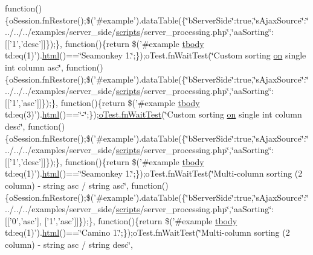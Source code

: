 \begin{DoxyCompactItemize}
function()\{o\+Session.\+fn\+Restore();\$('\#example').data\+Table(\{\char`\"{}b\+Server\+Side\char`\"{}\+:true,\char`\"{}s\+Ajax\+Source\char`\"{}\+:\char`\"{}../../../examples/server\+\_\+side/\hyperlink{tinymce_8jquery_8dev_8js_a09066d4d580eeec222f858d588b4cdef}{scripts}/server\+\_\+processing.\+php\char`\"{},\char`\"{}aa\+Sorting\char`\"{}\+:\mbox{[}\mbox{[}'1','desc'\mbox{]}\mbox{]}\});\}, function()\{return \$('\#example \hyperlink{core_8constructor_8js_a99b0542c7c50fe8757c55bf9dac5f3be}{tbody} td\+:eq(1)').\hyperlink{tinymce_8jquery_8dev_8js_ac2090bcf2ff968c0083d5de53a6544f3}{html}()==\char`\"{}Seamonkey 1.\char`\"{};\});o\+Test.\+fn\+Wait\+Test(\char`\"{}Custom sorting \hyperlink{fullpage_2plugin_8min_8js_a1cfa98b7fed2aaf9fee3b68dbb7f9497}{on} single int column asc\char`\"{}, function()\{o\+Session.\+fn\+Restore();\$('\#example').data\+Table(\{\char`\"{}b\+Server\+Side\char`\"{}\+:true,\char`\"{}s\+Ajax\+Source\char`\"{}\+:\char`\"{}../../../examples/server\+\_\+side/\hyperlink{tinymce_8jquery_8dev_8js_a09066d4d580eeec222f858d588b4cdef}{scripts}/server\+\_\+processing.\+php\char`\"{},\char`\"{}aa\+Sorting\char`\"{}\+:\mbox{[}\mbox{[}'1','asc'\mbox{]}\mbox{]}\});\}, function()\{return \$('\#example \hyperlink{core_8constructor_8js_a99b0542c7c50fe8757c55bf9dac5f3be}{tbody} td\+:eq(3)').\hyperlink{tinymce_8jquery_8dev_8js_ac2090bcf2ff968c0083d5de53a6544f3}{html}()==\char`\"{}-\/\char`\"{};\});\hyperlink{onhold_24__server-side_2__zero__config_8js_ab25c4d596771c0133cdc45178ce72c3d}{o\+Test.\+fn\+Wait\+Test}(\char`\"{}Custom sorting \hyperlink{fullpage_2plugin_8min_8js_a1cfa98b7fed2aaf9fee3b68dbb7f9497}{on} single int column desc\char`\"{}, function()\{o\+Session.\+fn\+Restore();\$('\#example').data\+Table(\{\char`\"{}b\+Server\+Side\char`\"{}\+:true,\char`\"{}s\+Ajax\+Source\char`\"{}\+:\char`\"{}../../../examples/server\+\_\+side/\hyperlink{tinymce_8jquery_8dev_8js_a09066d4d580eeec222f858d588b4cdef}{scripts}/server\+\_\+processing.\+php\char`\"{},\char`\"{}aa\+Sorting\char`\"{}\+:\mbox{[}\mbox{[}'1','desc'\mbox{]}\mbox{]}\});\}, function()\{return \$('\#example \hyperlink{core_8constructor_8js_a99b0542c7c50fe8757c55bf9dac5f3be}{tbody} td\+:eq(1)').\hyperlink{tinymce_8jquery_8dev_8js_ac2090bcf2ff968c0083d5de53a6544f3}{html}()==\char`\"{}Seamonkey 1.\char`\"{};\});o\+Test.\+fn\+Wait\+Test(\char`\"{}Multi-\/column sorting (2 column) -\/ string asc / string asc\char`\"{}, function()\{o\+Session.\+fn\+Restore();\$('\#example').data\+Table(\{\char`\"{}b\+Server\+Side\char`\"{}\+:true,\char`\"{}s\+Ajax\+Source\char`\"{}\+:\char`\"{}../../../examples/server\+\_\+side/\hyperlink{tinymce_8jquery_8dev_8js_a09066d4d580eeec222f858d588b4cdef}{scripts}/server\+\_\+processing.\+php\char`\"{},\char`\"{}aa\+Sorting\char`\"{}\+:\mbox{[}\mbox{[}'0','asc'\mbox{]}, \mbox{[}'1','asc'\mbox{]}\mbox{]}\});\}, function()\{return \$('\#example \hyperlink{core_8constructor_8js_a99b0542c7c50fe8757c55bf9dac5f3be}{tbody} td\+:eq(1)').\hyperlink{tinymce_8jquery_8dev_8js_ac2090bcf2ff968c0083d5de53a6544f3}{html}()==\char`\"{}Camino 1.\char`\"{};\});o\+Test.\+fn\+Wait\+Test(\char`\"{}Multi-\/column sorting (2 column) -\/ string asc / string desc\char`\"{}, 
\end{DoxyCompactItemize}
